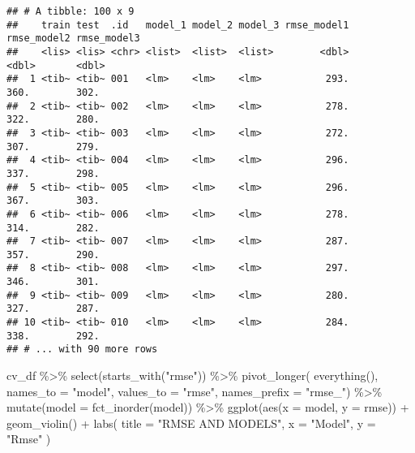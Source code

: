 \documentclass[
]{article}
\newenvironment{Shaded}{\begin{snugshade}}{\end{snugshade}}
\newcommand{\AttributeTok}[1]{\textcolor[rgb]{0.77,0.63,0.00}{#1}}
\newcommand{\FunctionTok}[1]{\textcolor[rgb]{0.00,0.00,0.00}{#1}}
\newcommand{\NormalTok}[1]{#1}
\newcommand{\SpecialCharTok}[1]{\textcolor[rgb]{0.00,0.00,0.00}{#1}}
\newcommand{\StringTok}[1]{\textcolor[rgb]{0.31,0.60,0.02}{#1}}
\begin{document}
\begin{verbatim}
## # A tibble: 100 x 9
##    train test  .id   model_1 model_2 model_3 rmse_model1 rmse_model2 rmse_model3
##    <lis> <lis> <chr> <list>  <list>  <list>        <dbl>       <dbl>       <dbl>
##  1 <tib~ <tib~ 001   <lm>    <lm>    <lm>           293.        360.        302.
##  2 <tib~ <tib~ 002   <lm>    <lm>    <lm>           278.        322.        280.
##  3 <tib~ <tib~ 003   <lm>    <lm>    <lm>           272.        307.        279.
##  4 <tib~ <tib~ 004   <lm>    <lm>    <lm>           296.        337.        298.
##  5 <tib~ <tib~ 005   <lm>    <lm>    <lm>           296.        367.        303.
##  6 <tib~ <tib~ 006   <lm>    <lm>    <lm>           278.        314.        282.
##  7 <tib~ <tib~ 007   <lm>    <lm>    <lm>           287.        357.        290.
##  8 <tib~ <tib~ 008   <lm>    <lm>    <lm>           297.        346.        301.
##  9 <tib~ <tib~ 009   <lm>    <lm>    <lm>           280.        327.        287.
## 10 <tib~ <tib~ 010   <lm>    <lm>    <lm>           284.        338.        292.
## # ... with 90 more rows
\end{verbatim}

\begin{Shaded}
\begin{Highlighting}[]
\NormalTok{cv\_df }\SpecialCharTok{\%\textgreater{}\%} 
  \FunctionTok{select}\NormalTok{(}\FunctionTok{starts\_with}\NormalTok{(}\StringTok{"rmse"}\NormalTok{)) }\SpecialCharTok{\%\textgreater{}\%} 
  \FunctionTok{pivot\_longer}\NormalTok{(}
    \FunctionTok{everything}\NormalTok{(),}
    \AttributeTok{names\_to =} \StringTok{"model"}\NormalTok{, }
    \AttributeTok{values\_to =} \StringTok{"rmse"}\NormalTok{,}
    \AttributeTok{names\_prefix =} \StringTok{"rmse\_"}\NormalTok{) }\SpecialCharTok{\%\textgreater{}\%} 
  \FunctionTok{mutate}\NormalTok{(}\AttributeTok{model =} \FunctionTok{fct\_inorder}\NormalTok{(model)) }\SpecialCharTok{\%\textgreater{}\%} 
  \FunctionTok{ggplot}\NormalTok{(}\FunctionTok{aes}\NormalTok{(}\AttributeTok{x =}\NormalTok{ model, }\AttributeTok{y =}\NormalTok{ rmse)) }\SpecialCharTok{+} 
  \FunctionTok{geom\_violin}\NormalTok{() }\SpecialCharTok{+}
   \FunctionTok{labs}\NormalTok{(}
        \AttributeTok{title =} \StringTok{"RMSE AND MODELS"}\NormalTok{,}
        \AttributeTok{x =} \StringTok{"Model"}\NormalTok{,}
        \AttributeTok{y =} \StringTok{"Rmse"}
\NormalTok{      )}
\end{Highlighting}
\end{Shaded}
\end{document}
